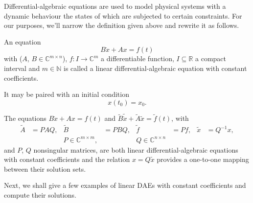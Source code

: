 Differential-algebraic equations are used to model physical systems with a dynamic behaviour the states of which are
subjected to certain constraints. For our purposes, we'll narrow the definition given above and rewrite it as follows.
\begin{definition}
    An equation
    \[
        B \dot{x} + Ax = f(t)
    \]
    with (\(A\), \(B \in \mathbb{C}^{m \times n}\)),
    \(f: I \rightarrow \mathbb{C}^m\) a differentiable function, \(I \subseteq \mathbb{R}\) a
    compact interval and \(m \in \mathbb{N}\) is called a linear differential-algebraic equation with constant
    coefficients.

    It may be paired with an initial condition
    \[
        x(t_{0}) = x_{0}.
    \]
\end{definition}

\begin{remark}
    The equations \(B \dot{x} + Ax = f(t)\) and \(\tilde{B} \tilde{\dot{x}} + \tilde{A}\tilde{x} = \tilde{f}(t)\), with
    \begin{align*}
        \tilde{A} &= PAQ, & \tilde{B} &= PBQ, & \tilde{f} &= Pf, & \tilde{x} &= Q^{-1}x, \\
        && P \in \mathbb{C}^{m \times m}, && Q \in \mathbb{C}^{n \times n}
    \end{align*}
    and \(P\), \(Q\) nonsingular matrices, are both linear differential-algebraic equations with constant coefficients and
    the relation \(x = Q\tilde{x}\) provides a one-to-one mapping between their solution sets.
\end{remark}

Next, we shall give a few examples of linear DAEs with constant coefficients and compute their solutions.

